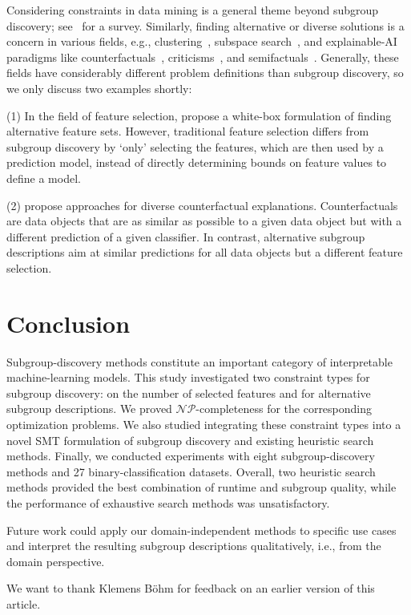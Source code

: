 \documentclass[acmsmall]{acmart} %
\theoremstyle{acmplain}
\theoremstyle{acmdefinition}
\begin{document}
Considering constraints in data mining is a general theme beyond subgroup discovery; see~\cite{grossi2017survey} for a survey.
Similarly, finding alternative or diverse solutions is a concern in various fields, e.g., clustering~\cite{bailey2014alternative}, subspace search~\cite{fouche2021efficient}, and explainable-AI paradigms like counterfactuals~\cite{guidotti2022counterfactual}, criticisms~\cite{kim2016examples}, and semifactuals~\cite{artelt2022even}.
Generally, these fields have considerably different problem definitions than subgroup discovery, so we only discuss two examples shortly:

(1)  In the field of feature selection, \cite{bach2023finding, bach2024alternative} propose a white-box formulation of finding alternative feature sets.
However, traditional feature selection differs from subgroup discovery by `only' selecting the features, which are then used by a prediction model, instead of directly determining bounds on feature values to define a model.

(2) \cite{karimi2020model, mohammadi2021scaling, mothilal2020explaining, russell2019efficient} propose approaches for diverse counterfactual explanations.
Counterfactuals are data objects that are as similar as possible to a given data object but with a different prediction of a given classifier.
In contrast, alternative subgroup descriptions aim at similar predictions for all data objects but a different feature selection.

\section{Conclusion}
\label{sec:csd:conclusion}

Subgroup-discovery methods constitute an important category of interpretable machine-learning models.
This study investigated two constraint types for subgroup discovery: 
on the number of selected features and for alternative subgroup descriptions.
We proved $\mathcal{NP}$-completeness for the corresponding optimization problems.
We also studied integrating these constraint types into a novel SMT formulation of subgroup discovery and existing heuristic search methods.
Finally, we conducted experiments with eight subgroup-discovery methods and 27 binary-classification datasets.
Overall, two heuristic search methods provided the best combination of runtime and subgroup quality, while the performance of exhaustive search methods was unsatisfactory.

Future work could apply our domain-independent methods to specific use cases and interpret the resulting subgroup descriptions qualitatively, i.e., from the domain perspective.

\begin{acks}
We want to thank Klemens Böhm for feedback on an earlier version of this article.
\end{acks}




\end{document}
